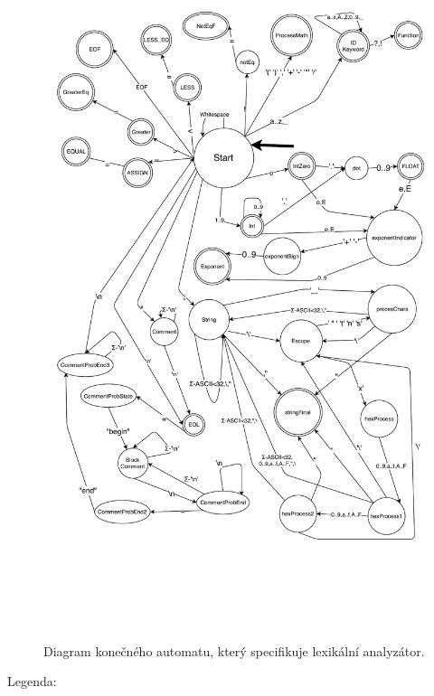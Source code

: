 \documentclass[a4paper, 11pt]{article}
\begin{document}
\begin{figure}[!]
	\centering
	\includegraphics[width=\linewidth,height=8in]{fsm_scanner.pdf}\\[1pt]
	\caption{Diagram konečného automatu, který specifikuje lexikální analyzátor.}
	\label{fsm}
\end{figure}

\newpage
{\Large{Legenda:}} 
\end{document}
